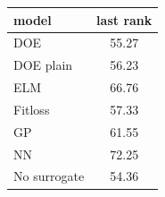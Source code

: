 \begin{tabular}{|lc|}
\hline
model & last rank\\
\hline
DOE & 55.27 \\
DOE plain & 56.23 \\
ELM & 66.76 \\
Fitloss & 57.33 \\
GP & 61.55 \\
NN & 72.25 \\
No surrogate & 54.36 \\
\hline
\end{tabular}
